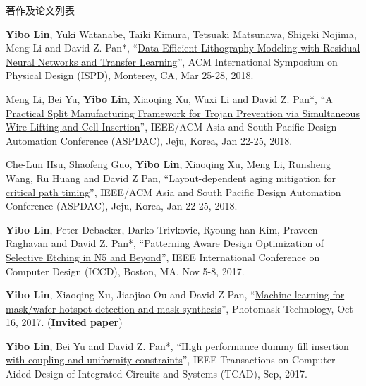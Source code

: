 \begin{rSection}{著作及论文列表}
\begin{description}[font=\normalfont, rightmargin=2em]
{}
            

\item[{[C23]}]{
        \textbf{Yibo Lin}, Yuki Watanabe, Taiki Kimura, Tetsuaki Matsunawa, Shigeki Nojima, Meng Li and David Z. Pan*, 
    ``\href{https://doi.org/10.1145/3177540.3178242}{Data Efficient Lithography Modeling with Residual Neural Networks and Transfer Learning}'', 
    ACM International Symposium on Physical Design (ISPD), Monterey, CA, Mar 25-28, 2018.
    
}
            

\item[{[C22]}]{
        Meng Li, Bei Yu, \textbf{Yibo Lin}, Xiaoqing Xu, Wuxi Li and David Z. Pan*, 
    ``\href{https://doi.org/10.1109/ASPDAC.2018.8297316}{A Practical Split Manufacturing Framework for Trojan Prevention via Simultaneous Wire Lifting and Cell Insertion}'', 
    IEEE/ACM Asia and South Pacific Design Automation Conference (ASPDAC), Jeju, Korea, Jan 22-25, 2018.
    
}
            

\item[{[C21]}]{
        Che-Lun Hsu, Shaofeng Guo, \textbf{Yibo Lin}, Xiaoqing Xu, Meng Li, Runsheng Wang, Ru Huang and David Z Pan, 
    ``\href{https://doi.org/10.1109/ASPDAC.2018.8297298}{Layout-dependent aging mitigation for critical path timing}'', 
    IEEE/ACM Asia and South Pacific Design Automation Conference (ASPDAC), Jeju, Korea, Jan 22-25, 2018.
    
}
            

\item[{[C20]}]{
        \textbf{Yibo Lin}, Peter Debacker, Darko Trivkovic, Ryoung-han Kim, Praveen Raghavan and David Z. Pan*, 
    ``\href{https://doi.org/10.1109/ICCD.2017.72}{Patterning Aware Design Optimization of Selective Etching in N5 and Beyond}'', 
    IEEE International Conference on Computer Design (ICCD), Boston, MA, Nov 5-8, 2017.
    
}
            

\item[{[C19]}]{
        \textbf{Yibo Lin}, Xiaoqing Xu, Jiaojiao Ou and David Z Pan, 
    ``\href{http://dx.doi.org/10.1117/12.2282943}{Machine learning for mask/wafer hotspot detection and mask synthesis}'', 
    Photomask Technology, Oct 16, 2017.
    (\textbf{Invited paper})
}
            

\item[{[J18]}]{
        \textbf{Yibo Lin}, Bei Yu and David Z. Pan*, 
    ``\href{http://dx.doi.org/10.1109/TCAD.2016.2638452}{High performance dummy fill insertion with coupling and uniformity constraints}'', 
    IEEE Transactions on Computer-Aided Design of Integrated Circuits and Systems (TCAD), Sep, 2017.
    
}
\end{description}
\end{rSection}
